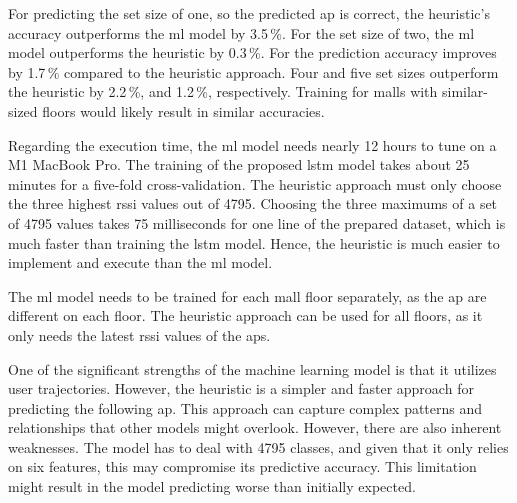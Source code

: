 For predicting the set size of one, so the predicted \ac{ap} is correct, the heuristic's accuracy outperforms the \ac{ml} model by 3.5\,\%.
For the set size of two, the \ac{ml} model outperforms the heuristic by 0.3\,\%.
For \threeAP the prediction accuracy improves by 1.7\,\% compared to the heuristic approach.
Four and five set sizes outperform the heuristic by 2.2\,\%, and 1.2\,\%, respectively.
Training for malls with similar-sized floors would likely result in similar accuracies.

Regarding the execution time, the \ac{ml} model needs nearly 12 hours to tune on a M1 MacBook Pro.
The training of the proposed \ac{lstm} model takes about 25 minutes for a five-fold cross-validation.
The heuristic approach must only choose the three highest \ac{rssi} values out of 4795.
Choosing the three maximums of a set of 4795 values takes 75 milliseconds for one line of the prepared dataset, which is much faster than training the \ac{lstm} model.
Hence, the heuristic is much easier to implement and execute than the \ac{ml} model.

The \ac{ml} model needs to be trained for each mall floor separately, as the \ac{ap} are different on each floor.
The heuristic approach can be used for all floors, as it only needs the latest \ac{rssi} values of the \acp{ap}.

One of the significant strengths of the machine learning model is that it utilizes user trajectories.
However, the heuristic is a simpler and faster approach for predicting the following \ac{ap}.
This approach can capture complex patterns and relationships that other models might overlook.
However, there are also inherent weaknesses.
The model has to deal with 4795 classes, and given that it only relies on six features, this may compromise its predictive accuracy.
This limitation might result in the model predicting worse than initially expected.
